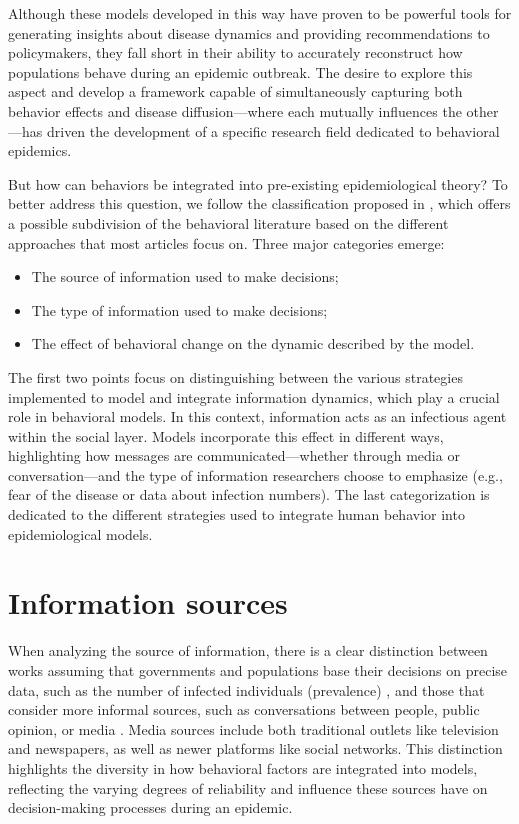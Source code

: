 Although these models developed in this way have proven to be powerful tools for generating insights about disease dynamics and providing recommendations to policymakers, they fall short in their ability to accurately reconstruct how populations behave during an epidemic outbreak. The desire to explore this aspect and develop a framework capable of simultaneously capturing both behavior effects and disease diffusion—where each mutually influences the other—has driven the development of a specific research field dedicated to behavioral epidemics.

But how can behaviors be integrated into pre-existing epidemiological theory? To better address this question, we follow the classification proposed in \cite{Funk_2010}, which offers a possible subdivision of the behavioral literature based on the different approaches that most articles focus on. Three major categories emerge:
\begin{itemize}
	\item The source of information used to make decisions;
	\item The type of information used to make decisions;
	\item The effect of behavioral change on the dynamic described by  the model. 
\end{itemize}


The first two points focus on distinguishing between the various strategies implemented to model and integrate information dynamics, which play a crucial role in behavioral models. In this context, information acts as an infectious agent within the social layer. Models incorporate this effect in different ways, highlighting how messages are communicated—whether through media or conversation—and the type of information researchers choose to emphasize (e.g., fear of the disease or data about infection numbers). The last categorization is dedicated to the different strategies used to integrate human behavior into epidemiological models.
\section{Information sources}
When analyzing the source of information, there is a clear distinction between works assuming that governments and populations base their decisions on precise data, such as the number of infected individuals (prevalence) \cite{Vogiatzis2010,Collinson2014, Tyson_2020}, and those that consider more informal sources, such as conversations between people, public opinion, or media \cite{Bulai2023, Sontag2022}. Media sources include both traditional outlets like television and newspapers, as well as newer platforms like social networks.
This distinction highlights the diversity in how behavioral factors are integrated into models, reflecting the varying degrees of reliability and influence these sources have on decision-making processes during an epidemic.

